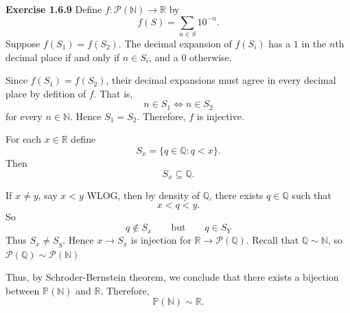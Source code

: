 \documentclass[12pt]{article}
\begin{document}
\noindent{} \textbf{Exercise 1.6.9}
Define $f:\mathcal P(\mathbb N)\to\mathbb R$ by
\[
    f(S)=\sum_{n\in S}10^{-n}.
\]
Suppose $f(S_1)=f(S_2)$. The decimal expansion of $f(S_i)$
has a $1$ in the $n$th decimal place if and only if $n\in S_i$,
and a $0$ otherwise.

Since $f(S_1)=f(S_2)$, their decimal expansions must agree in every
decimal place by defition of $f$.
That is,
\[
    n\in S_1 \iff n\in S_2
\]
for every $n\in\mathbb N$. Hence $S_1=S_2$.
Therefore, $f$ is injective.

For each $x \in \mathbb{R}$ define
\[
    S_x = \{q \in \mathbb{Q} : q < x\}.
\]
Then
\[
    S_x \subseteq \mathbb{Q}.
\]

If $x \neq y$, say $x < y$ WLOG, then by density of $\mathbb{Q}$,
there exists $q \in \mathbb{Q}$ such that
\[
    x < q < y.
\]
So
\[
    q \notin S_x \qquad \text{but} \qquad q \in S_Y
\]
Thus $S_x \neq S_y$.
Hence $x \to S_x$ is injection for $\mathbb{R} \to \mathcal{P}(\mathbb{Q})$.
Recall that $\mathbb{Q} \sim \mathbb{N}$, so $\mathcal{P}(\mathbb{Q}) \sim \mathcal{P}(\mathbb{N})$

Thus, by Schroder-Bernstein theorem, we conclude that there exists
a bijection between $\mathbb{P}(\mathbb{N})$ and $\mathbb{R}$.
Therefore,
\[
    \mathbb{P}(\mathbb{N}) \sim \mathbb{R}.
\]
\end{document}
